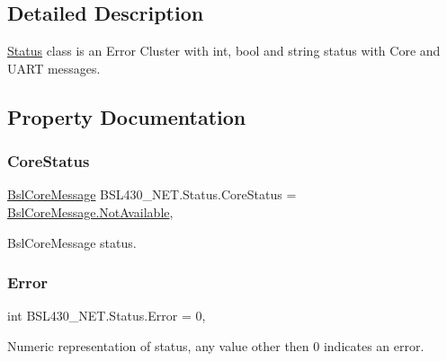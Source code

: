 \subsection{Detailed Description}
\mbox{\hyperlink{class_b_s_l430___n_e_t_1_1_status}{Status}} class is an Error Cluster with int, bool and string status with Core and U\+A\+RT messages. 



\subsection{Property Documentation}
\mbox{\label{class_b_s_l430___n_e_t_1_1_status_a5f12c381516ea195adfee38c4f361d1f}} 
\subsubsection{\texorpdfstring{CoreStatus}{CoreStatus}}
{\footnotesize\ttfamily \mbox{\hyperlink{namespace_b_s_l430___n_e_t_ac916153c12b33a95ee1fd35e1a15f17a}{Bsl\+Core\+Message}} B\+S\+L430\+\_\+\+N\+E\+T.\+Status.\+Core\+Status = \mbox{\hyperlink{namespace_b_s_l430___n_e_t_ae93ff76b832d2a9a0c3d67665e2f25aca534ceac854da4ba59c4dc41b7ab732dc}{Bsl\+Core\+Message.\+Not\+Available}}\hspace{0.3cm}{\ttfamily [get]}, {\ttfamily [set]}}



Bsl\+Core\+Message status. 

\mbox{\label{class_b_s_l430___n_e_t_1_1_status_a87f62acd0c7cabf8da4adfc7a780dea6}} 
\subsubsection{\texorpdfstring{Error}{Error}}
{\footnotesize\ttfamily int B\+S\+L430\+\_\+\+N\+E\+T.\+Status.\+Error = 0\hspace{0.3cm}{\ttfamily [get]}, {\ttfamily [set]}}



Numeric representation of status, any value other then 0 indicates an error. 

\mbox{\label{class_b_s_l430___n_e_t_1_1_status_acba1ced827ba52a463c0a6c530aece11}} 
